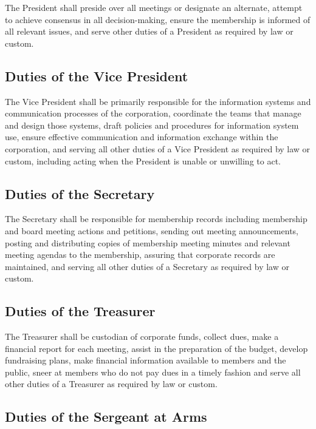 \documentclass[10pt,letterpaper,titlepage]{article}
\begin{document}
The President shall preside over all meetings or designate an alternate,
attempt to achieve consensus in all decision-making, ensure the membership is
informed of all relevant issues, and serve other duties of a President as
required by law or custom. 

\subsection{Duties of the Vice President}

The Vice President shall be primarily responsible for the information systems
and communication processes of the corporation, coordinate the teams that
manage and design those systems, draft policies and procedures for information
system use, ensure effective communication and information exchange within the
corporation, and serving all other duties of a Vice President as required by
law or custom, including acting when the President is unable or unwilling to
act.

\subsection{Duties of the Secretary}

The Secretary shall be responsible for membership records including membership
and board meeting actions and petitions, sending out meeting announcements,
posting and distributing copies of membership meeting minutes and relevant
meeting agendas to the membership, assuring that corporate records are
maintained, and serving all other duties of a Secretary as required by law or
custom. 

\subsection{Duties of the Treasurer}

The Treasurer shall be custodian of corporate funds, collect dues, make a
financial report for each meeting, assist in the preparation of the budget,
develop fundraising plans, make financial information available to members and
the public, sneer at members who do not pay dues in a timely fashion and serve
all other duties of a Treasurer as required by law or custom. 

\subsection{Duties of the Sergeant at Arms}
\end{document}
